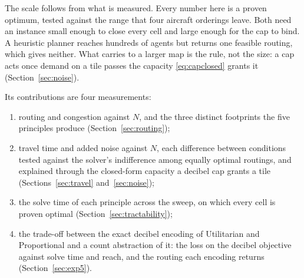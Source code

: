 The scale follows from what is measured. Every number here is a proven optimum, tested
against the range that four aircraft orderings leave. Both need an instance small enough
to close every cell and large enough for the cap to bind. A heuristic planner reaches
hundreds of agents but returns one feasible routing, which gives neither. What carries to
a larger map is the rule, not the size: a cap acts once demand on a tile passes the
capacity \eqref{eq:capclosed} grants it (Section~\ref{sec:noise}).

Its contributions are four measurements:
\begin{enumerate}
\item routing and congestion against $N$, and the three distinct footprints the five
      principles produce (Section~\ref{sec:routing});
\item travel time and added noise against $N$, each difference between conditions tested
      against the solver's indifference among equally optimal routings, and explained
      through the closed-form capacity a decibel cap grants a tile
      (Sections~\ref{sec:travel} and~\ref{sec:noise});
\item the solve time of each principle across the sweep, on which every cell is proven
      optimal (Section~\ref{sec:tractability});
\item the trade-off between the exact decibel encoding of Utilitarian and Proportional and
      a count abstraction of it: the loss on the decibel objective against solve time and
      reach, and the routing each encoding returns (Section~\ref{sec:exp5}).
\end{enumerate}
